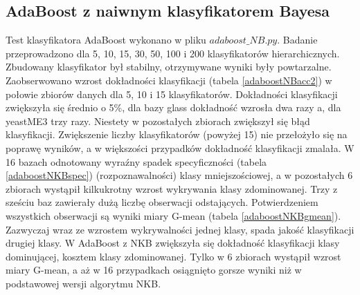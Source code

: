 \subsection{AdaBoost z naiwnym klasyfikatorem Bayesa}
Test klasyfikatora AdaBoost wykonano w pliku $adaboost\_NB.py$. Badanie przeprowadzono dla 5, 10, 15, 30, 50, 100 i 200 klasyfikatorów hierarchicznych. Zbudowany klasyfikator był stabilny, otrzymywane wyniki były powtarzalne. Zaobserwowano wzrost dokładności klasyfikacji (tabela \ref{adaboostNBacc2}) w połowie zbiorów danych dla 5, 10 i 15 klasyfikatorów. Dokładności klasyfikacji zwiększyła się średnio o 5\%, dla bazy glass dokładność wzrosła dwa razy a, dla yeastME3 trzy razy. Niestety w pozostałych zbiorach zwiększył się błąd klasyfikacji. Zwiększenie liczby klasyfikatorów (powyżej 15) nie przełożyło się na poprawę wyników, a w większości przypadków dokładność klasyfikacji zmalała. W 16 bazach odnotowany wyraźny spadek specyficzności (tabela \ref{adaboostNKBspec}) (rozpoznawalności) klasy mniejszościowej, a w pozostałych 6 zbiorach wystąpił kilkukrotny wzrost wykrywania klasy zdominowanej. Trzy z sześciu baz zawierały dużą liczbę obserwacji odstających. Potwierdzeniem wszystkich obserwacji są wyniki miary G-mean (tabela \ref{adaboostNKBgmean}). Zazwyczaj wraz ze wzrostem wykrywalności jednej klasy, spada jakość klasyfikacji drugiej klasy. W AdaBoost z NKB zwiększyła się dokładność klasyfikacji klasy dominującej, kosztem klasy zdominowanej. Tylko w 6 zbiorach wystąpił wzrost miary G-mean, a aż w 16 przypadkach osiągnięto gorsze wyniki niż w podstawowej wersji algorytmu NKB.
